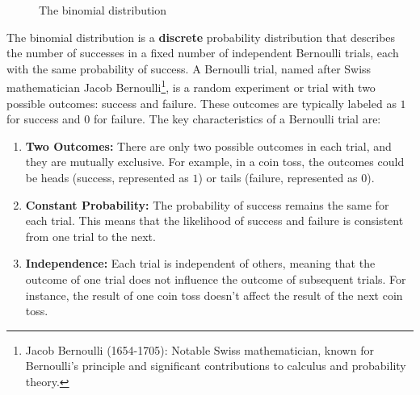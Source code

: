 \documentclass[
  a4paper,
]{scrbook}
\begin{document}
\begin{figure}[ht]


\caption{\label{fig-bn-dist}The binomial distribution}

\end{figure}%

The binomial distribution is a \textbf{discrete} probability
distribution that describes the number of successes in a fixed number of
independent Bernoulli trials, each with the same probability of success.
A Bernoulli trial, named after Swiss mathematician Jacob
Bernoulli\footnote{Jacob Bernoulli (1654-1705): Notable Swiss
  mathematician, known for Bernoulli's principle and significant
  contributions to calculus and probability theory.}, is a random
experiment or trial with two possible outcomes: success and failure.
These outcomes are typically labeled as \(1\) for success and \(0\) for
failure. The key characteristics of a Bernoulli trial are:

\begin{enumerate}
\def\labelenumi{\arabic{enumi}.}
\item
  \textbf{Two Outcomes:} There are only two possible outcomes in each
  trial, and they are mutually exclusive. For example, in a coin toss,
  the outcomes could be heads (success, represented as \(1\)) or tails
  (failure, represented as \(0\)).
\item
  \textbf{Constant Probability:} The probability of success remains the
  same for each trial. This means that the likelihood of success and
  failure is consistent from one trial to the next.
\item
  \textbf{Independence:} Each trial is independent of others, meaning
  that the outcome of one trial does not influence the outcome of
  subsequent trials. For instance, the result of one coin toss doesn't
  affect the result of the next coin toss.
\end{enumerate}
\end{document}
